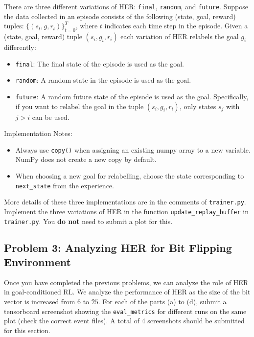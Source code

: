 \documentclass[12pt]{article}
\begin{document}
There are three different variations of HER: \verb|final|, \verb|random|, and \verb|future|. Suppose the data collected in an episode consists of the following (state, goal, reward) tuples: $\{ (s_t, g, r_t) \}_{t=0}^{T}$, where $t$ indicates each time step in the episode. 
Given a (state, goal, reward) tuple $(s_i, g_i, r_i)$ each variation of HER relabels the goal $g_i$ differently:
\begin{itemize}
    \item \verb|final|: The final state of the episode is used as the goal.
    \item \verb|random|: A random state in the episode is used as the goal.
    \item \verb|future|: A random future state of the episode is used as the goal. Specifically, if you want to relabel the goal in the tuple $(s_i, g_i, r_i)$, only states $s_j$ with $j > i$ can be used.
\end{itemize}

Implementation Notes:
\begin{itemize}
    \item Always use \texttt{copy()} when assigning an existing numpy array to a new variable. NumPy does not create a new copy by default.
    \item When choosing a new goal for relabelling, choose the state corresponding to \texttt{next\_state} from the experience.
\end{itemize}
More details of these three implementations are in the comments of \verb|trainer.py|. Implement the three variations of HER in the function \verb|update_replay_buffer| in \texttt{trainer.py}. You \textbf{do not} need to submit a plot for this. 

\subsection*{Problem 3: Analyzing HER for Bit Flipping Environment}
Once you have completed the previous problems, we can analyze the role of HER in goal-conditioned RL. We analyze the performance of HER as the size of the bit vector is increased from $6$ to $25$. For each of the parts (a) to (d), submit a tensorboard screenshot showing the \texttt{eval\_metrics} for different runs on the same plot (check the correct event files). A total of 4 screenshots should be submitted for this section.
\end{document}
